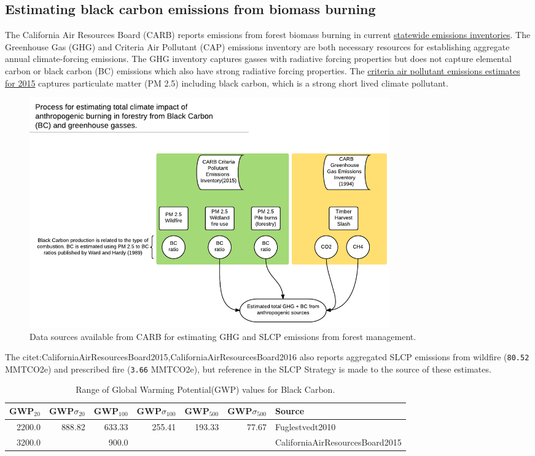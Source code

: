 \documentclass[a4paper]{article}
\begin{document}
\subsection{Estimating black carbon emissions from biomass burning}
\label{sec-2-1}

The California Air Resources Board (CARB) reports
emissions from forest biomass burning  in current
\href{http://www.arb.ca.gov/ei/ei.htm}{statewide emissions inventories}. The Greenhouse Gas (GHG) and Criteria Air
Pollutant (CAP) emissions inventory are both necessary resources for establishing
aggregate annual climate-forcing emissions. The GHG inventory captures
gasses with radiative forcing properties but does not capture elemental
carbon or black carbon (BC) emissions which also have strong radiative
forcing properties. The
\href{http://www.arb.ca.gov/ei/emissiondata.htm}{criteria air pollutant
emissions estimates for 2015} captures particulate matter (PM 2.5) including black carbon, which
is a strong short lived climate pollutant.

\begin{figure}[htb]
\centering
\includegraphics[width=0.75\textwidth]{./graphics/burning.pdf}
\caption{Data sources available from CARB for estimating GHG and SLCP emissions from forest management.}
\end{figure}

The citet:CaliforniaAirResourcesBoard2015,CaliforniaAirResourcesBoard2016
also reports aggregated SLCP emissions from wildfire
(\texttt{80.52} MMTCO2e) and prescribed fire
(\texttt{3.66} MMTCO2e), but reference in the
SLCP Strategy is made to the source of these estimates.



\begin{table}[htb]
\caption{Range of Global Warming Potential(GWP) values for Black Carbon.}
\centering
\begin{tabular}{rrrrrrl}
GWP$_{\text{20}}$ & GWP$\sigma$$_{\text{20}}$ & GWP$_{\text{100}}$ & GWP$\sigma$$_{\text{100}}$ & GWP$_{\text{500}}$ & GWP$\sigma$$_{\text{500}}$ & Source\\
\hline
2200.0 & 888.82 & 633.33 & 255.41 & 193.33 & 77.67 & Fuglestvedt2010\\
3200.0 &  & 900.0 &  &  &  & CaliforniaAirResourcesBoard2015\\
\end{tabular}
\end{table}
\end{document}

